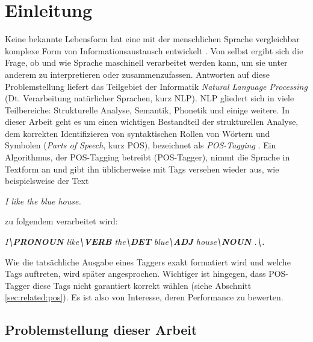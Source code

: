 %
\chapter{Einleitung}
\label{sec:intro}




Keine bekannte Lebensform hat eine mit der menschlichen Sprache vergleichbar komplexe Form von Informationsaustausch entwickelt \cite{Rao}. Von selbst ergibt sich die Frage, ob und wie Sprache maschinell verarbeitet werden kann, um sie unter anderem zu interpretieren oder zusammenzufassen. Antworten auf diese Problemstellung liefert das Teilgebiet der Informatik \textit{Natural Language Processing} (Dt. Verarbeitung natürlicher Sprachen, kurz NLP). NLP gliedert sich in viele Teilbereiche: Strukturelle Analyse, Semantik, Phonetik und einige weitere. In dieser Arbeit geht es um einen wichtigen Bestandteil der strukturellen Analyse, dem korrekten Identifizieren von syntaktischen Rollen von Wörtern und Symbolen (\textit{Parts of Speech}, kurz POS), bezeichnet als \textit{POS-Tagging} \cite{Smith}.
\newline
Ein Algorithmus, der POS-Tagging betreibt (POS-Tagger), nimmt die Sprache in Textform an und gibt ihn üblicherweise mit Tags versehen wieder aus, wie beispielsweise der Text
\newline \newline
\centerline{\textit{I like the blue house.}}
	
 zu folgendem verarbeitet wird:
\newline \newline
\centerline{\textit{I\textbf{\textbackslash PRONOUN} like\textbf{\textbackslash VERB} the\textbf{\textbackslash DET} blue\textbf{\textbackslash ADJ} house\textbf{\textbackslash NOUN} .\textbf{\textbackslash .}}}

Wie die tatsächliche Ausgabe eines Taggers exakt formatiert wird und welche Tags auftreten, wird später angesprochen. Wichtiger ist hingegen, dass POS-Tagger diese Tags nicht garantiert korrekt wählen (siehe Abschnitt \ref{sec:related:pos}). Es ist also von Interesse, deren Performance zu bewerten.


\section{Problemstellung dieser Arbeit}
\label{sec:intro:task}

